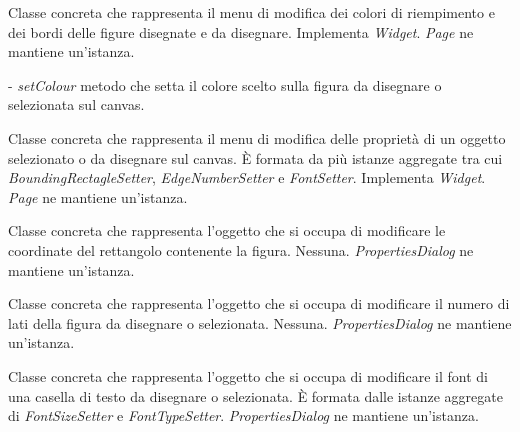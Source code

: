 Classe concreta che rappresenta il menu di modifica dei colori di riempimento e dei bordi delle figure disegnate e da disegnare.
Implementa \textit{Widget}.
\textit{Page} ne mantiene un'istanza.
\begin{elencopuntato}[\normindent]
\item[-]  \textit{setColour} metodo che setta il colore scelto sulla figura da disegnare o selezionata sul canvas.
\end{elencopuntato}

Classe concreta che rappresenta  il menu di modifica delle propriet\` a di un oggetto selezionato o da disegnare sul canvas.
\` E formata da pi\` u istanze aggregate tra cui \textit{BoundingRectagleSetter}, \textit{EdgeNumberSetter} e \textit{FontSetter}. Implementa \textit{Widget}.
\textit{Page} ne mantiene un'istanza.

Classe concreta che rappresenta l'oggetto che si occupa di modificare le coordinate del rettangolo contenente la figura.
Nessuna.
\textit{PropertiesDialog} ne mantiene un'istanza.

Classe concreta che rappresenta l'oggetto che si occupa di modificare il numero di lati della figura da disegnare o selezionata.
Nessuna.
\textit{PropertiesDialog} ne mantiene un'istanza.

Classe concreta che rappresenta l'oggetto che si occupa di modificare il font di una casella di testo da disegnare o selezionata.
\` E formata dalle istanze aggregate di \textit{FontSizeSetter} e \textit{FontTypeSetter}.
\textit{PropertiesDialog} ne mantiene un'istanza.

